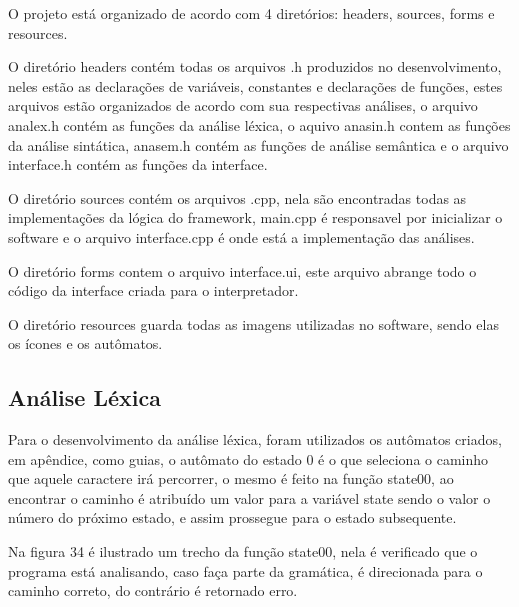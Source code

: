 \documentclass[12pt,oneside,a4paper,chapter=TITLE,section=TITLE,sumario=tradicional]{abntex2}
\begin{document}
\begin{figure}[htb]
\end{figure}

O projeto está organizado de acordo com 4 diretórios: headers, sources, forms e resources.

O diretório headers contém todas os arquivos .h produzidos no desenvolvimento, neles estão as declarações de variáveis, constantes e declarações de funções, estes arquivos estão organizados de acordo com sua respectivas análises, o arquivo analex.h contém as funções da análise léxica, o aquivo anasin.h contem as funções da análise sintática, anasem.h contém as funções de análise semântica e o arquivo interface.h contém as funções da interface.

O diretório sources contém os arquivos .cpp, nela são encontradas todas as implementações da lógica do framework, main.cpp é responsavel por inicializar o software e o arquivo interface.cpp é onde está a implementação das análises.

O diretório forms contem o arquivo interface.ui, este arquivo abrange todo o código da interface criada para o interpretador.

O diretório resources guarda todas as imagens utilizadas no software, sendo elas os ícones e os autômatos.

\subsection{Análise Léxica}
\label{subsec:analiselexica}

Para o desenvolvimento da análise léxica, foram utilizados os autômatos criados, em apêndice, como guias, o autômato do estado 0 é o que seleciona o caminho que aquele caractere irá percorrer, o mesmo é feito na função state00, ao encontrar o caminho é atribuído um valor para a variável state sendo o valor o número do próximo estado, e assim prossegue para o estado subsequente.

Na figura 34 é ilustrado um trecho da função state00, nela é verificado que o programa está analisando, caso faça parte da gramática, é direcionada para o caminho correto, do contrário é retornado erro.

\begin{figure}[htb]
\end{figure} 
\end{document}
